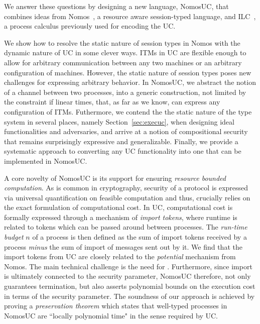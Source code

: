 We answer these questions by designing a new language, NomosUC, that combines ideas from
Nomos~\cite{dasnomos}, a resource aware session-typed language, and ILC~\cite{ilc},
a process calculus previously used for encoding the UC.

We show how to resolve the static nature of session types in Nomos with the dynamic nature of UC in some clever ways. 
ITMs in UC are flexible enough to allow for arbitrary communication between any two machines or an arbitrary configuration of machines.
However, the static nature of session types poses new challenges for expressing arbitrary behavior.
In NomosUC, we abstract the notion of a channel between two processes, into a generic construction, not limited by the constraint
if linear times, that, as far as we know, can express any configuration of ITMs.
Futhermore, we contend the the static nature of the type system in several places, namely Section~\ref{sec:execuc}, when designing ideal functionalities and adversaries,
and arrive at a notion of compositional security that remains surprisingly expressive and generalizable.
Finally, we provide a systematic approach to converting any UC functionality into one that can be implemented in NomosUC.

A core novelty of NomosUC is its support for ensuring \emph{resource bounded computation}.
As is common in cryptography, security of a protocol is expressed via universal quantification
on feasible computation and thus, crucially relies on the exact formulation of computational cost.
In UC, computational cost is formally expressed through a mechanism of \emph{import tokens}, where runtime is related to tokens which can be passed around between processes.
The \emph{run-time budget} $n$ of a process is then defined as the sum of import tokens received by a process \emph{minus} the sum of import of messages sent out by it.
We find that the import tokens from UC are closely related to the \emph{potential} mechanism from Nomos.
The main technical challenge is the need for .
Furthermore, since import is ultimately connected to the security parameter, NomosUC
therefore, not only guarantees termination, but also asserts polynomial bounds on
the execution cost in terms of the security parameter.
The soundness of our approach is achieved by proving a \emph{preservation theorem}
which states that well-typed processes in NomosUC are ``locally polynomial time"
in the sense required by UC.

